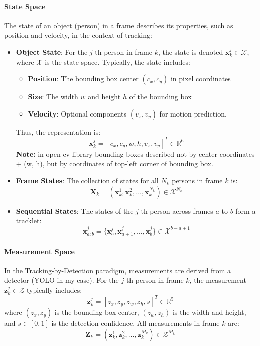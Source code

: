 \documentclass[12pt, a4paper]{article}
\begin{document}
\paragraph{State Space}
The state of an object (person) in a frame describes its properties, such as position and velocity, in the context of tracking:
\begin{itemize}
    \item \textbf{Object State}: For the $j$-th person in frame $k$, the state is denoted $\mathbf{x}_k^j \in \mathcal{X}$, where $\mathcal{X}$ is the state space. Typically, the state includes:
    \begin{itemize}
        \item \textbf{Position}: The bounding box center $(c_x, c_y)$ in pixel coordinates
        \item \textbf{Size}: The width $w$ and height $h$ of the bounding box
        \item \textbf{Velocity}: Optional components $(v_x, v_y)$ for motion prediction.
    \end{itemize}
    Thus, the representation is:
    \[
    \mathbf{x}_k^j = [c_x, c_y, w, h, v_x, v_y]^T \in \mathbb{R}^6
    \]
    \textbf{Note:} in open-cv library bounding boxes described not by center coordinates + (w, h), but by coordinates of top-left corner of bounding box.
    \item \textbf{Frame States}: The collection of states for all $N_k$ persons in frame $k$ is:
    \[
    \mathbf{X}_k = (\mathbf{x}_k^1, \mathbf{x}_k^2, \ldots, \mathbf{x}_k^{N_k}) \in \mathcal{X}^{N_k}
    \]
    \item \textbf{Sequential States}: The states of the $j$-th person across frames $a$ to $b$ form a tracklet:
    \[
    \mathbf{x}_{a:b}^j = \{\mathbf{x}_a^j, \mathbf{x}_{a+1}^j, \ldots, \mathbf{x}_b^j\} \in \mathcal{X}^{b-a+1}
    \]
\end{itemize}

\paragraph{Measurement Space}
In the Tracking-by-Detection paradigm, measurements are derived from a detector (YOLO in my case). For the $j$-th person in frame $k$, the measurement $\mathbf{z}_k^j \in \mathcal{Z}$ typically includes:
    \[
    \mathbf{z}_k^j = [z_x, z_y, z_w, z_h, s]^T \in \mathbb{R}^5
    \]
    where $(z_x, z_y)$ is the bounding box center, $(z_w, z_h)$ is the width and height, and $s \in [0,1]$ is the detection confidence.
    All measurements in frame $k$ are:
    \[
    \mathbf{Z}_k = (\mathbf{z}_k^1, \mathbf{z}_k^2, \ldots, \mathbf{z}_k^{M_k}) \in \mathcal{Z}^{M_k}
    \]
\end{document}
